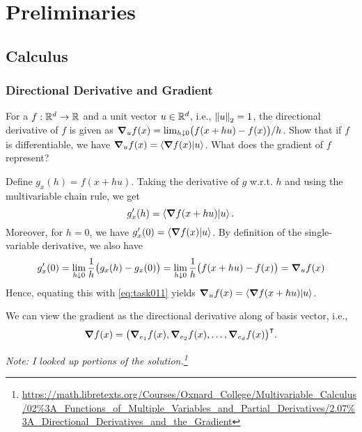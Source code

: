 \setcounter{chapter}{-1}

\chapter{Preliminaries}

\section{Calculus}
    \subsection{Directional Derivative and Gradient}
        For a \(f : \mathbb{R}^d \to \mathbb{R}\) and a unit vector \(u \in \mathbb{R}^d\), i.e., \(\norm{u}_2 = 1\), the directional derivative of \(f\) is given as \(\grad_u f(x) = \lim_{h \downarrow 0} \bigl( f(x + hu) - f(x) \bigr) / h\). Show that if \(f\) is differentiable, we have \(\grad_u f(x) = \ip{\grad{f(x)}}{u}\). What does the gradient of \(f\) represent?

        \begin{solution}
            Define \(g_x(h) = f(x + h u)\). Taking the derivative of \(g\) w.r.t. \(h\) and using the multivariable chain rule, we get
            \begin{equation}
                g_x'(h) = \ip{\grad{f(x + h u)}}{u}.  \label{eq:task011}
            \end{equation}
            Moreover, for \(h = 0\), we have \( g_x'(0) = \ip{\grad{f(x)}}{u} \). By definition of the single-variable derivative, we also have
            \begin{equation}
                g_x'(0)
                    = \lim_{h \downarrow 0} \frac{1}{h} \bigl( g_x(h) - g_x(0) \bigr)
                    = \lim_{h \downarrow 0} \frac{1}{h} \bigl( f(x + h u) - f(x) \bigr)
                    = \grad_u f(x)
            \end{equation}
            Hence, equating this with \cref{eq:task011} yields \(\grad_u f(x) = \ip{\grad{f(x + h u)}}{u}\).

            We can view the gradient as the directional derivative along of basis vector, i.e.,
            \begin{equation}
                \grad{f(x)} = \bigl( \grad_{e_1} f(x), \grad_{e_2} f(x), \dots, \grad_{e_d} f(x) \bigr)^{\intercal}.
            \end{equation}

            \emph{Note: I looked up portions of the solution.\footnote{\url{https://math.libretexts.org/Courses/Oxnard_College/Multivariable_Calculus/02\%3A_Functions_of_Multiple_Variables_and_Partial_Derivatives/2.07\%3A_Directional_Derivatives_and_the_Gradient}}}
        \end{solution}

